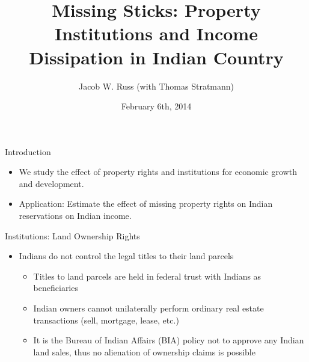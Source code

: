 \documentclass[ignorenonframetext,]{beamer}
\title{Missing Sticks: Property Institutions and Income Dissipation in Indian
Country}
\author{Jacob W. Russ (with Thomas Stratmann)}
\date{February 6th, 2014}
\begin{document}
\frame{\titlepage}

\begin{frame}{Introduction}

\begin{itemize}
\item
  We study the effect of property rights and institutions for economic
  growth and development.
\item
  Application: Estimate the effect of missing property rights on Indian
  reservations on Indian income.
\end{itemize}

\end{frame}

\begin{frame}{Institutions: Land Ownership Rights}

\begin{itemize}
\itemsep1pt\parskip0pt
\item
  Indians do not control the legal titles to their land parcels

  \begin{itemize}
  \item
    Titles to land parcels are held in federal trust with Indians as
    beneficiaries
  \item
    Indian owners cannot unilaterally perform ordinary real estate
    transactions (sell, mortgage, lease, etc.)
  \item
    It is the Bureau of Indian Affairs (BIA) policy not to approve any
    Indian land sales, thus no alienation of ownership claims is
    possible
  \end{itemize}
\end{itemize}

\end{frame}
\end{document}
